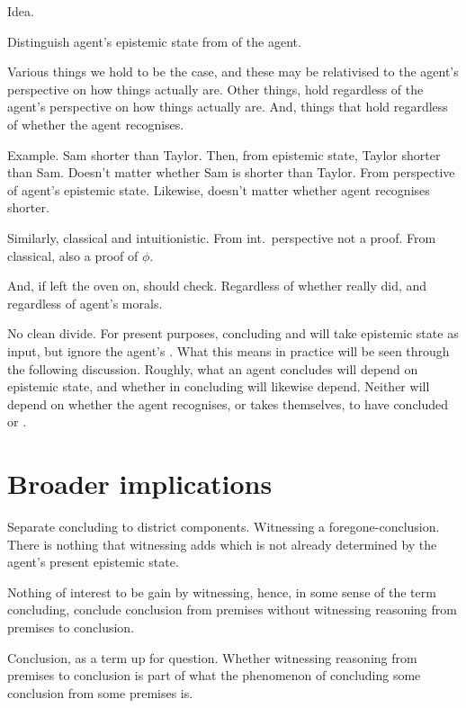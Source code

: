\begin{note}
  Idea.
\end{note}

\begin{note}
  Distinguish agent's epistemic state from \stance{} of the agent.

  Various things we hold to be the case, and these may be relativised to the agent's perspective on how things actually are.
  Other things, hold regardless of the agent's perspective on how things actually are.
  And, things that hold regardless of whether the agent recognises.

  Example.
  Sam shorter than Taylor.
  Then, from epistemic state, Taylor shorter than Sam.
  Doesn't matter whether Sam is shorter than Taylor.
  From perspective of agent's epistemic state.
  Likewise, doesn't matter whether agent recognises shorter.

  Similarly, classical and intuitionistic.
  From int.\ perspective not a proof.
  From classical, also a proof of \(\phi\).

  And, if left the oven on, should check.
  Regardless of whether really did, and regardless of agent's morals.

  No clean divide.
  For present purposes, concluding and \csN{} will take epistemic state as input, but ignore the agent's \stance{}.
  What this means in practice will be seen through the following discussion.
  Roughly, what an agent concludes will depend on epistemic state, and whether \csN{} in concluding will likewise depend.
  Neither will depend on whether the agent recognises, or takes themselves, to have concluded or \csVed{}.
\end{note}

\section{Broader implications}

\begin{note}
  Separate concluding to district components.
  Witnessing a foregone-conclusion.
  There is nothing that witnessing adds which is not already determined by the agent's present epistemic state.

  Nothing of interest to be gain by witnessing, hence, in some sense of the term concluding, conclude conclusion from premises without witnessing reasoning from premises to conclusion.

  Conclusion, as a term up for question.
  Whether witnessing reasoning from premises to conclusion is part of what the phenomenon of concluding some conclusion from some premises is.
\end{note}

